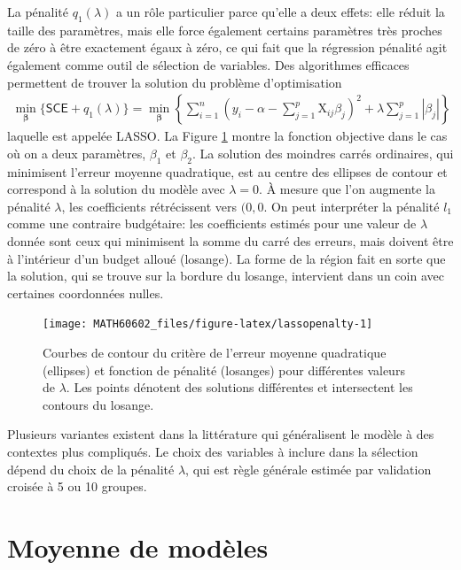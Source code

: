 \documentclass[
  11pt,
  letterpaper,
]{book}
\theoremstyle{definition}
\theoremstyle{definition}
\theoremstyle{definition}
\theoremstyle{remark}
\begin{document}
La pénalité \(q_1(\lambda)\) a un rôle particulier parce qu'elle a deux effets: elle réduit la taille des paramètres, mais elle force également certains paramètres très proches de zéro à être exactement égaux à zéro, ce qui fait que la régression pénalité agit également comme outil de sélection de variables. Des algorithmes efficaces permettent de trouver la solution du problème d'optimisation
\begin{align*}
\min_{\boldsymbol{\beta}} \{\mathsf{SCE} + q_1(\lambda)\} = \min_{\boldsymbol{\beta}}  \left\{\sum_{i=1}^n \left(y_i - \alpha - \sum_{j=1}^p\mathrm{X}_{ij}\beta_{j}\right)^2 +
\lambda \sum_{j=1}^p |\beta_j|\right\}
\end{align*}
laquelle est appelée LASSO. La Figure \ref{fig:lassopenalty} montre la fonction objective dans le cas où on a deux paramètres, \(\beta_1\) et \(\beta_2\). La solution des moindres carrés ordinaires, qui minimisent l'erreur moyenne quadratique, est au centre des ellipses de contour et correspond à la solution du modèle avec \(\lambda=0\). À mesure que l'on augmente la pénalité \(\lambda\), les coefficients rétrécissent vers \((0, 0\). On peut interpréter la pénalité \(l_1\) comme une contraire budgétaire: les coefficients estimés pour une valeur de \(\lambda\) donnée sont ceux qui minimisent la somme du carré des erreurs, mais doivent être à l'intérieur d'un budget alloué (losange). La forme de la région fait en sorte que la solution, qui se trouve sur la bordure du losange, intervient dans un coin avec certaines coordonnées nulles.

\begin{figure}

{\centering \texttt{[image: MATH60602\_files/figure-latex/lassopenalty-1]} 

}

\caption{Courbes de contour du critère de l'erreur moyenne quadratique (ellipses) et fonction de pénalité (losanges) pour différentes valeurs de $\lambda$. Les points dénotent des solutions différentes et intersectent les contours du losange.}\label{fig:lassopenalty}
\end{figure}

Plusieurs variantes existent dans la littérature qui généralisent le modèle à des contextes plus compliqués. Le choix des variables à inclure dans la sélection dépend du choix de la pénalité \(\lambda\), qui est règle générale estimée par validation croisée à 5 ou 10 groupes.

\hypertarget{moyenne-de-moduxe8les}{%
\section{Moyenne de modèles}\label{moyenne-de-moduxe8les}}
\end{document}
